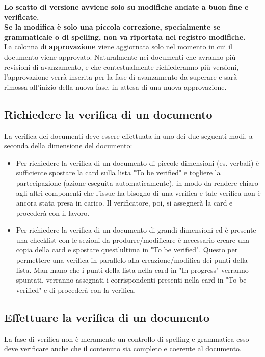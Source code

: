 \noindent
\textbf{Lo scatto di versione avviene solo su modifiche andate a buon fine e verificate.}
\\

\noindent
\textbf{Se la modifica è solo una piccola correzione, specialmente se grammaticale o di
spelling, non va riportata nel registro modifiche.}\\


\noindent
La colonna di \textbf{approvazione} viene aggiornata solo nel momento in cui il documento viene approvato. Naturalmente nei documenti che avranno più revisioni di avanzamento, e che contestualmente richiederanno più versioni, l'approvazione verrà inserita per la fase di avanzamento da superare e sarà rimossa all'inizio della nuova fase, in attesa di una nuova approvazione.

\subsection{Richiedere la verifica di un documento}
La verifica dei documenti deve essere effettuata in uno dei due seguenti modi, a seconda della dimensione del documento:
\begin{itemize}
    \item Per richiedere la verifica di un documento di piccole dimensioni (es. verbali) è sufficiente spostare la card sulla lista "To be verified" e togliere la partecipazione (azione eseguita automaticamente), in modo da rendere chiaro agli altri componenti che l'issue ha bisogno di una verifica e tale verifica non è ancora stata presa in carico. Il verificatore, poi, si assegnerà la card e procederà con il lavoro.
    \item Per richiedere la verifica di un documento di grandi dimensioni ed è presente una checklist con le sezioni da produrre/modificare è necessario creare una copia della card e spostare quest'ultima in "To be verified". Questo per permettere una verifica in parallelo alla creazione/modifica dei punti della lista. Man mano che i punti della lista nella card in "In progress" verranno spuntati, verranno assegnati i corrispondenti presenti nella card in "To be verified" e di procederà con la verifica.
\end{itemize}

\subsection{Effettuare la verifica di un documento}
La fase di verifica non è meramente un controllo di spelling e grammatica esso
deve verificare anche che il contenuto sia completo e coerente al documento.

